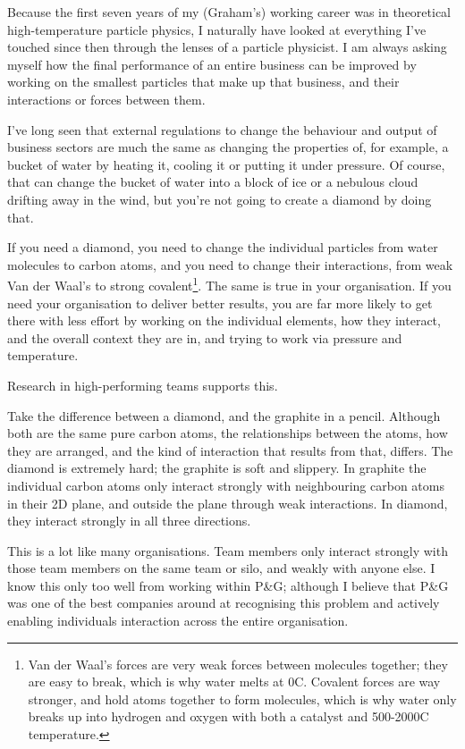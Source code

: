 Because the first seven years of my (Graham’s) working career was in theoretical high-temperature particle physics, I naturally have looked at everything I've touched since then through the lenses of a particle physicist. I am always asking myself how the final performance of an entire business can be improved by working on the smallest particles that make up that business, and their interactions or forces between them.


I've long seen that external regulations to change the behaviour and output of business sectors are much the same as changing the properties of, for example, a bucket of water by heating it, cooling it or putting it under pressure. Of course, that can change the bucket of water into a block of ice or a nebulous cloud drifting away in the wind, but you're not going to create a diamond by doing that.


If you need a diamond, you need to change the individual particles from water molecules to carbon atoms, and you need to change their interactions, from weak Van der Waal's to strong covalent\footnote{Van der Waal’s forces are very weak forces between molecules together; they are easy to break, which is why water melts at 0\textdegree{}C. Covalent forces are way stronger, and hold atoms together to form molecules, which is why water only breaks up into hydrogen and oxygen with both a catalyst and 500-2000\textdegree{}C temperature. }. The same is true in your organisation. If you need your organisation to deliver better results, you are far more likely to get there with less effort by working on the individual elements, how they interact, and the overall context they are in, and trying to work via pressure and temperature.


Research in high-performing teams supports this.


Take the difference between a diamond, and the graphite in a pencil. Although both are the same pure carbon atoms, the relationships between the atoms, how they are arranged, and the kind of interaction that results from that, differs. The diamond is extremely hard; the graphite is soft and slippery. In graphite the individual carbon atoms only interact strongly with neighbouring carbon atoms in their 2D plane, and outside the plane through weak interactions. In diamond, they interact strongly in all three directions.


This is a lot like many organisations. Team members  only interact strongly with those team members on the same team or silo, and weakly with anyone else. I know this only too well from working within P\&G; although I believe that P\&G  was one of the best companies around at recognising this problem and actively enabling individuals interaction across the entire organisation.


